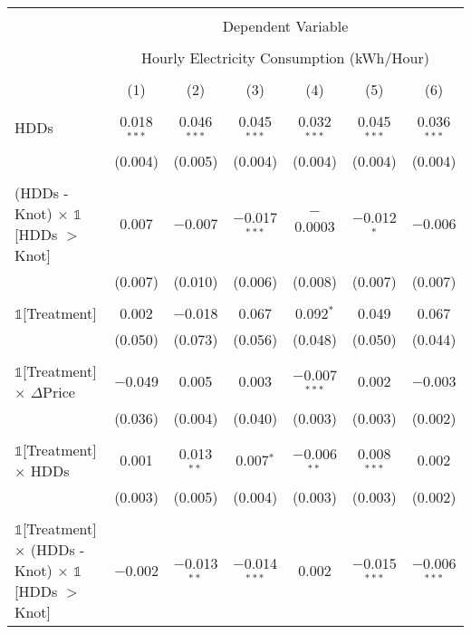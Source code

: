
\begin{table}[!htbp] \centering 
  \label{Table:Breakdown-of-Average-Treatement-Effects_As-a-Function-of-Rate-Changes_For-Different-Intervals} 
\scriptsize 
\begin{longtable}{@{\extracolsep{15pt}}lcccccc} 
\\[-1.8ex]\hline 
\hline \\[-1.8ex] 
 & \multicolumn{6}{c}{Dependent Variable} \\ 
\cline{2-7} 
\\[-1.8ex] & \multicolumn{6}{c}{Hourly Electricity Consumption  (kWh/Hour)} \\ 
\\[-1.8ex] & (1) & (2) & (3) & (4) & (5) & (6)\\ 
\hline \\[-1.8ex] \endhead
 HDDs & 0.018$^{***}$ & 0.046$^{***}$ & 0.045$^{***}$ & 0.032$^{***}$ & 0.045$^{***}$ & 0.036$^{***}$ \\ 
  & (0.004) & (0.005) & (0.004) & (0.004) & (0.004) & (0.004) \\ 
  & & & & & & \\ 
 (HDDs - Knot) $\times$ $\mathbb{1}$[HDDs $>$ Knot] & 0.007 & $-$0.007 & $-$0.017$^{***}$ & $-$0.0003 & $-$0.012$^{*}$ & $-$0.006 \\ 
  & (0.007) & (0.010) & (0.006) & (0.008) & (0.007) & (0.007) \\ 
  & & & & & & \\ 
 $\mathbb{1}$[Treatment] & 0.002 & $-$0.018 & 0.067 & 0.092$^{*}$ & 0.049 & 0.067 \\ 
  & (0.050) & (0.073) & (0.056) & (0.048) & (0.050) & (0.044) \\ 
  & & & & & & \\ 
 $\mathbb{1}$[Treatment] $\times$ $\Delta$Price & $-$0.049 & 0.005 & 0.003 & $-$0.007$^{***}$ & 0.002 & $-$0.003 \\ 
  & (0.036) & (0.004) & (0.040) & (0.003) & (0.003) & (0.002) \\ 
  & & & & & & \\ 
 $\mathbb{1}$[Treatment] $\times$ HDDs & 0.001 & 0.013$^{**}$ & 0.007$^{*}$ & $-$0.006$^{**}$ & 0.008$^{***}$ & 0.002 \\ 
  & (0.003) & (0.005) & (0.004) & (0.003) & (0.003) & (0.002) \\ 
  & & & & & & \\ 
 $\mathbb{1}$[Treatment] $\times$ (HDDs - Knot) $\times$ $\mathbb{1}$[HDDs $>$ Knot] & $-$0.002 & $-$0.013$^{**}$ & $-$0.014$^{***}$ & 0.002 & $-$0.015$^{***}$ & $-$0.006$^{***}$ \\ 

\end{longtable}
\end{table}
